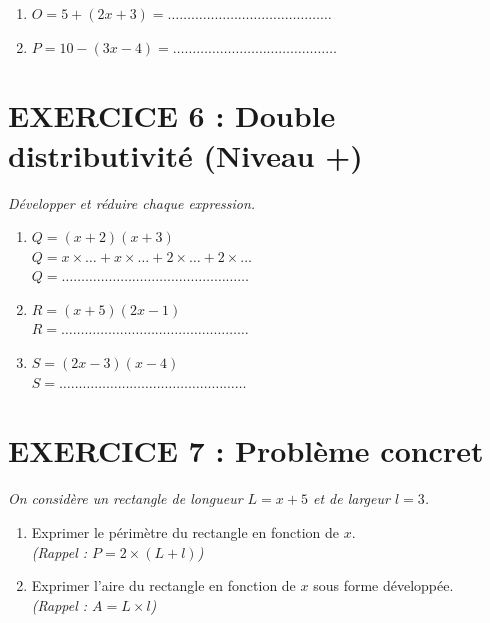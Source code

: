 \documentclass[11pt,a4paper]{article}
\begin{document}
    \begin{enumerate}
        \item $O = 5 + (2x + 3) = \dots\dots\dots\dots\dots\dots\dots\dots\dots\dots\dots\dots\dots\dots$
        \item $P = 10 - (3x - 4) = \dots\dots\dots\dots\dots\dots\dots\dots\dots\dots\dots\dots\dots\dots$
    \end{enumerate}
    
    \section*{EXERCICE 6 : Double distributivité (Niveau +)}
    \textit{Développer et réduire chaque expression.}
    
    \begin{enumerate}
        \item $Q = (x + 2)(x + 3)$ \\
        $Q = x \times \dots + x \times \dots + 2 \times \dots + 2 \times \dots$ \\
        $Q = \dots\dots\dots\dots\dots\dots\dots\dots\dots\dots\dots\dots\dots\dots\dots\dots$
        
        \item $R = (x + 5)(2x - 1)$ \\
        $R = \dots\dots\dots\dots\dots\dots\dots\dots\dots\dots\dots\dots\dots\dots\dots\dots$
        
        \item $S = (2x - 3)(x - 4)$ \\
        $S = \dots\dots\dots\dots\dots\dots\dots\dots\dots\dots\dots\dots\dots\dots\dots\dots$
    \end{enumerate}
    
    \section*{EXERCICE 7 : Problème concret}
    \textit{On considère un rectangle de longueur $L = x + 5$ et de largeur $l = 3$.}
    
    \begin{enumerate}
        \item Exprimer le périmètre du rectangle en fonction de $x$. \\
        \textit{(Rappel : $P = 2 \times (L + l)$)} \\
        \dotfill
        \item Exprimer l'aire du rectangle en fonction de $x$ sous forme développée. \\
        \textit{(Rappel : $A = L \times l$)} \\
        \dotfill
    \end{enumerate}
\end{document}
